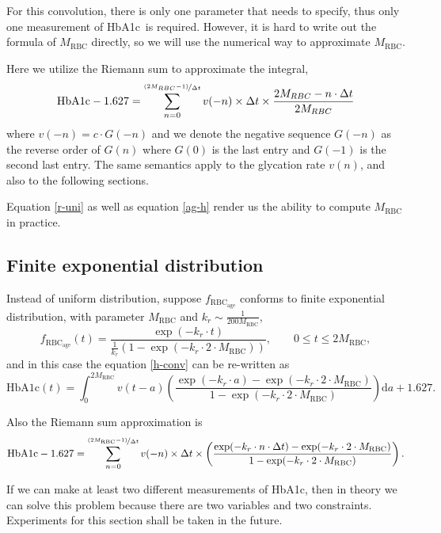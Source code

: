 \documentclass{article}
\newcommand{\hba}{\textrm{HbA1c}}
\newcommand{\f}{f_{\mathrm{RBC}_{\mathrm{age}}}}
\newcommand{\dd}{\mathrm{d }}
\newcommand{\mean}{M_\mathrm{RBC}}
\begin{document}
For this convolution, there is only one parameter that needs to specify, thus only one measurement of \hba\ is required. However, it is hard to write out the formula of $\mean$ directly, so we will use the numerical way to approximate $\mean$.

Here we utilize the Riemann sum to approximate the integral,
\begin{equation}
\hba-1.627 = \sum_{n=0}^{\nicefrac{(2M_{RBC}-1)}{\Delta t}}v(-n)\times \Delta t \times\frac{2M_{RBC}-n\cdot \Delta t}{2M_{RBC}}
\label{r-uni}
\end{equation}
where $v(-n)=c\cdot G(-n)$ and we denote the negative sequence $G(-n)$ as the reverse order of  $G(n)$ where $G(0)$ is the last entry and $G(-1)$ is the second last entry. The same semantics apply to  the glycation rate $v(n)$, and also to the following sections.

Equation \ref{r-uni} as well as equation \ref{ag-h} render us the ability to compute $\mean$ in practice.


\subsection{Finite exponential distribution}
Instead of uniform distribution, suppose $\f$ conforms to finite exponential distribution, with parameter $\mean$ and $k_r\sim\frac{1}{200\mean}$,
\[\f(t) = \frac{\exp(-k_r\cdot t)}{\frac{1}{k_r}\left(1-\exp(-k_r\cdot 2\cdot \mean)\right)},\quad\quad 0\leq t\leq 2\mean,\]
and in this case the equation \ref{h-conv} can be re-written as
\[\hba(t) = \int_{0}^{2\mean}v(t-a)\left(\frac{\exp(-k_r\cdot a)-\exp(-k_r\cdot 2\cdot \mean)}{1-\exp(-k_r\cdot 2\cdot \mean)}\right) \dd a + 1.627.\]

Also the Riemann sum approximation is
\begin{equation}
\hba-1.627 = \sum_{n=0}^{\nicefrac{(2\mean-1)}{\Delta t}}v(-n)\times \Delta t \times\left(\frac{\exp(-k_r\cdot n\cdot \Delta t)-\exp(-k_r\cdot 2\cdot \mean)}{1-\exp(-k_r\cdot 2\cdot \mean)}\right).
\label{r-exp}
\end{equation}

If we can make at least two different measurements of \hba, then in theory we can solve this problem because there are two variables and two constraints. Experiments for this section shall be taken in the future.
\end{document}
